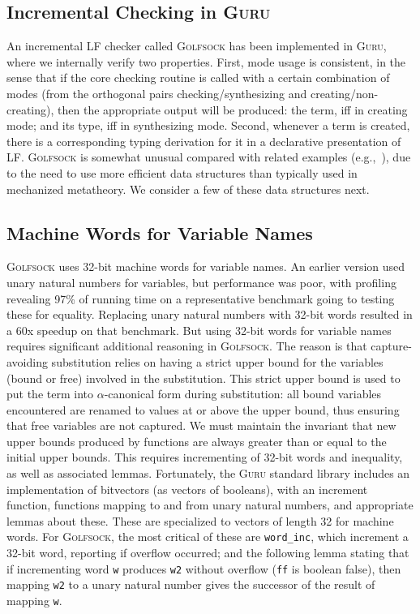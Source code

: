 \documentclass[9pt,natbib]{sigplanconf}
\begin{document}
\subsection{Incremental Checking in \textsc{Guru}}

An incremental LF checker called \textsc{Golfsock} has been
implemented in \textsc{Guru}, where we internally verify two
properties.  First, mode usage is consistent, in the sense that if the
core checking routine is called with a certain combination of modes
(from the orthogonal pairs checking/synthesizing and
creating/non-creating), then the appropriate output will be produced:
the term, iff in creating mode; and its type, iff in synthesizing
mode.  Second, whenever a term is created, there is a corresponding
typing derivation for it in a declarative presentation of LF.
\textsc{Golfsock} is somewhat unusual compared with related examples
(e.g.,~\cite{urban+08}), due to the need to use more efficient data
structures than typically used in mechanized metatheory.  We consider
a few of these data structures next.

\subsection{Machine Words for Variable Names}

\textsc{Golfsock} uses 32-bit machine words for variable names.  An
earlier version used unary natural numbers for variables, but
performance was poor, with profiling revealing 97\% of running time on
a representative benchmark going to testing these for equality.
Replacing unary natural numbers with 32-bit words resulted in a 60x
speedup on that benchmark.  But using 32-bit words for variable names
requires significant additional reasoning in \textsc{Golfsock}.  The
reason is that capture-avoiding substitution relies on having a strict
upper bound for the variables (bound or free) involved in the
substitution.  This strict upper bound is used to put the term into
$\alpha$-canonical form during substitution: all bound variables
encountered are renamed to values at or above the upper bound, thus
ensuring that free variables are not captured.  We must maintain the
invariant that new upper bounds produced by functions are always
greater than or equal to the initial upper bounds.  This requires
incrementing of 32-bit words and inequality, as well as associated
lemmas.  Fortunately, the \textsc{Guru} standard library includes an
implementation of bitvectors (as vectors of booleans), with an
increment function, functions mapping to and from unary natural
numbers, and appropriate lemmas about these.  These are specialized to
vectors of length 32 for machine words.  For \textsc{Golfsock}, the
most critical of these are \texttt{word\_inc}, which increment a
32-bit word, reporting if overflow occurred; and the following lemma
stating that if incrementing word \texttt{w} produces \texttt{w2}
without overflow (\texttt{ff} is boolean false), then mapping
\texttt{w2} to a unary natural number gives the successor of the 
result of mapping \texttt{w}.
\end{document}
